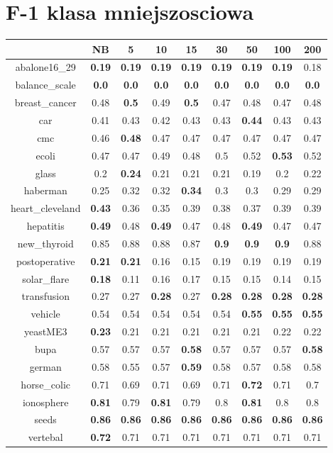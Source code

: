 \documentclass{article}%
\begin{document}
%
\section*{F{-}1 klasa mniejszosciowa}%
\begin{tabular}{c|cccccccc}%
\hline%
&NB&5&10&15&30&50&100&200\\%
\hline%
abalone16\_29&\textbf{0.19}&\textbf{0.19}&\textbf{0.19}&\textbf{0.19}&\textbf{0.19}&\textbf{0.19}&\textbf{0.19}&0.18\\%
\hline%
balance\_scale&\textbf{0.0}&\textbf{0.0}&\textbf{0.0}&\textbf{0.0}&\textbf{0.0}&\textbf{0.0}&\textbf{0.0}&\textbf{0.0}\\%
\hline%
breast\_cancer&0.48&\textbf{0.5}&0.49&\textbf{0.5}&0.47&0.48&0.47&0.48\\%
\hline%
car&0.41&0.43&0.42&0.43&0.43&\textbf{0.44}&0.43&0.43\\%
\hline%
cmc&0.46&\textbf{0.48}&0.47&0.47&0.47&0.47&0.47&0.47\\%
\hline%
ecoli&0.47&0.47&0.49&0.48&0.5&0.52&\textbf{0.53}&0.52\\%
\hline%
glass&0.2&\textbf{0.24}&0.21&0.21&0.21&0.19&0.2&0.22\\%
\hline%
haberman&0.25&0.32&0.32&\textbf{0.34}&0.3&0.3&0.29&0.29\\%
\hline%
heart\_cleveland&\textbf{0.43}&0.36&0.35&0.39&0.38&0.37&0.39&0.39\\%
\hline%
hepatitis&\textbf{0.49}&0.48&\textbf{0.49}&0.47&0.48&\textbf{0.49}&0.47&0.47\\%
\hline%
new\_thyroid&0.85&0.88&0.88&0.87&\textbf{0.9}&\textbf{0.9}&\textbf{0.9}&0.88\\%
\hline%
postoperative&\textbf{0.21}&\textbf{0.21}&0.16&0.15&0.19&0.19&0.19&0.19\\%
\hline%
solar\_flare&\textbf{0.18}&0.11&0.16&0.17&0.15&0.15&0.14&0.15\\%
\hline%
transfusion&0.27&0.27&\textbf{0.28}&0.27&\textbf{0.28}&\textbf{0.28}&\textbf{0.28}&\textbf{0.28}\\%
\hline%
vehicle&0.54&0.54&0.54&0.54&0.54&\textbf{0.55}&\textbf{0.55}&\textbf{0.55}\\%
\hline%
yeastME3&\textbf{0.23}&0.21&0.21&0.21&0.21&0.21&0.22&0.22\\%
\hline%
bupa&0.57&0.57&0.57&\textbf{0.58}&0.57&0.57&0.57&\textbf{0.58}\\%
\hline%
german&0.58&0.55&0.57&\textbf{0.59}&0.58&0.57&0.58&0.58\\%
\hline%
horse\_colic&0.71&0.69&0.71&0.69&0.71&\textbf{0.72}&0.71&0.7\\%
\hline%
ionosphere&\textbf{0.81}&0.79&\textbf{0.81}&0.79&0.8&\textbf{0.81}&0.8&0.8\\%
\hline%
seeds&\textbf{0.86}&\textbf{0.86}&\textbf{0.86}&\textbf{0.86}&\textbf{0.86}&\textbf{0.86}&\textbf{0.86}&\textbf{0.86}\\%
\hline%
vertebal&\textbf{0.72}&0.71&0.71&0.71&0.71&0.71&0.71&0.71\\%
\hline%
\end{tabular}
\end{document}
